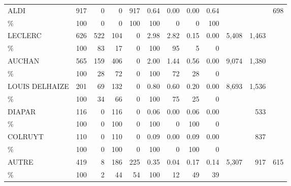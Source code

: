 \documentclass[11pt]{article}
\begin{document}
\begin{table}[H]
\begin{tabular}{l|rrrr|rrrr|rrr}
ALDI           &        917 &          0 &          0 &        917 &       0.64 &       0.00 &       0.00 &       0.64 &            &            &        698 \\
\%             &        100 &          0 &          0 &        100 &        100 &          0 &          0 &        100 &            &            &            \\
LECLERC        &        626 &        522 &        104 &          0 &       2.98 &       2.82 &       0.15 &       0.00 &      5,408 &      1,463 &            \\
\%             &        100 &         83 &         17 &          0 &        100 &         95 &          5 &          0 &            &            &            \\
AUCHAN         &        565 &        159 &        406 &          0 &       2.00 &       1.44 &       0.56 &       0.00 &      9,074 &      1,380 &            \\
\%             &        100 &         28 &         72 &          0 &        100 &         72 &         28 &          0 &            &            &            \\
LOUIS DELHAIZE &        201 &         69 &        132 &          0 &       0.80 &       0.60 &       0.20 &       0.00 &      8,693 &      1,536 &            \\
\%             &        100 &         34 &         66 &          0 &        100 &         75 &         25 &          0 &            &            &            \\
DIAPAR         &        116 &          0 &        116 &          0 &       0.06 &       0.00 &       0.06 &       0.00 &            &        533 &            \\
\%             &        100 &          0 &        100 &          0 &        100 &          0 &        100 &          0 &            &            &            \\
COLRUYT        &        110 &          0 &        110 &          0 &       0.09 &       0.00 &       0.09 &       0.00 &            &        837 &            \\
\%             &        100 &          0 &        100 &          0 &        100 &          0 &        100 &          0 &            &            &            \\
AUTRE          &        419 &          8 &        186 &        225 &       0.35 &       0.04 &       0.17 &       0.14 &      5,307 &        917 &        615 \\
\%             &        100 &          2 &         44 &         54 &        100 &         12 &         49 &         39 &            &            &            \\


\end{tabular}
\end{table}
\end{document}

